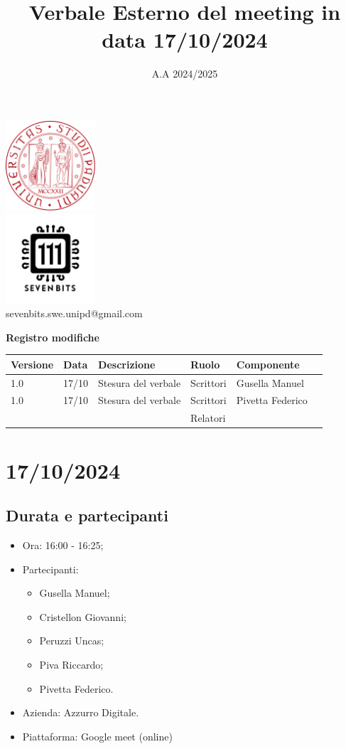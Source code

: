 \documentclass[12pt]{article}
\title{Verbale Esterno del meeting in data 17/10/2024}
\date{A.A 2024/2025}
\begin{document}
\maketitle
\center 
\includegraphics[width=0.25\textwidth]{LogoUnipd}\\
\includegraphics[width=0.25\textwidth]{Sevenbitslogo}\\
sevenbits.swe.unipd@gmail.com\\
\vspace{2mm}

\textbf{Registro modifiche}\\
\vspace{2mm}
\begin{tabular}{|l|l|l|l|l|l|}
\hline
\textbf{Versione} & \textbf{Data} & \textbf{Descrizione} & \textbf{Ruolo} & \textbf{Componente} \\
\hline
1.0 & 17/10 & Stesura del verbale & Scrittori & Gusella Manuel\\
\hline
1.0 & 17/10 & Stesura del verbale & Scrittori & Pivetta Federico\\
\hline
& & & Relatori & \\
\hline
\end{tabular}

\raggedright
\tableofcontents
\newpage
\section{17/10/2024}
\subsection{Durata e partecipanti}
\begin{itemize}
\item Ora: 16:00 - 16:25;
\item Partecipanti: 	
	\begin{itemize}
	\item Gusella Manuel;
	\item Cristellon Giovanni;
	\item Peruzzi Uncas;
	\item Piva Riccardo;
	\item Pivetta Federico.
	\end{itemize}
\item Azienda: Azzurro Digitale.
\item Piattaforma: Google meet (online)
\end{itemize}
\end{document}
